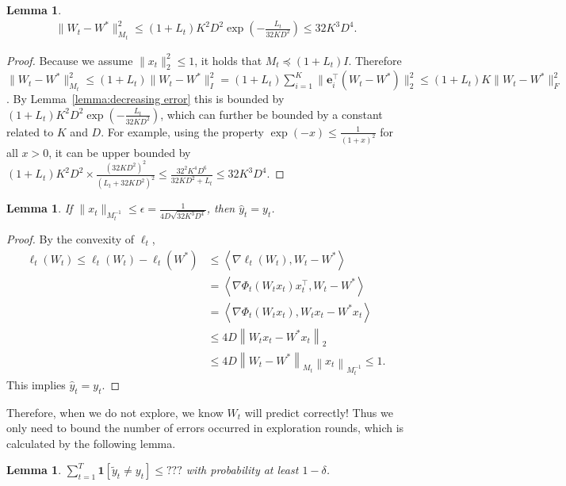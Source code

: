 \documentclass{article}
\newcommand{\one}{\boldsymbol{1}}
\newcommand{\nb}{\nabla}
\newcommand{\e}{\mathbf{e}}
\newcommand{\inner}[1]{ \left\langle {#1} \right\rangle }
\newcommand{\norm}[1]{\left\|{#1}\right\|}
\newtheorem{lemma}[theorem]{Lemma}
\begin{document}
\begin{lemma}
\begin{align*}
\|W_{t}-W^*\|_{M_{t}}^2 \leq (1+L_t)K^2D^2 \exp\left(-\frac{L_t}{32KD^2}\right) \leq 32K^3D^4. 
\end{align*}
\end{lemma}
\begin{proof}
Because we assume $\|x_t\|_2^2\leq 1$, it holds that $ M_t \preceq (1+L_t) I$. Therefore $\|W_t-W^*\|_{M_t}^2 \leq (1+L_t)\|W_t-W^*\|_I^2 =  (1+L_t) \sum_{i=1}^K \| \e_i^\top (W_t-W^*) \|_2^2 \leq (1+L_t) K \|W_t-W^*\|_F^2 $. By Lemma~\ref{lemma:decreasing error} this is bounded by $(1+L_t)K^2D^2\exp\left( -\frac{L_t}{32KD^2} \right)$, which can further be bounded by a constant related to $K$ and $D$. For example, using the property $\exp(-x)\leq \frac{1}{(1+x)^2}$ for all $x>0$, it can be upper bounded by $(1+L_t)K^2D^2 \times \frac{(32KD^2)^2}{(L_t+32KD^2)^2} \leq \frac{32^2K^4D^6}{32KD^2+L_t}\leq 32K^3D^4$.   
\end{proof}

\begin{lemma}
\label{lemma: xbounded}
If $\|x_t\|_{M_t^{-1}}\leq \epsilon = \frac{1}{4D\sqrt{32K^3D^4}}$, then $\hat{y}_t=y_t$. 
\end{lemma}
\begin{proof}
By the convexity of $\ell_t$, 
\begin{align*}
    \ell_t(W_t)\leq \ell_t(W_t)-\ell_t(W^*)&\leq \inner{\nb \ell_t(W_t), W_t-W^*}\\
     & = \inner{\nb\Phi_t(W_tx_t)x_t^\top, W_t - W^*} \\
    & = \inner{\nb\Phi_t(W_tx_t), W_tx_t - W^*x_t} \\
    & \leq 4D\norm{W_tx_t-W^*x_t}_2 \\
    & \leq 4D\norm{W_t-W^*}_{M_t}\norm{x_t}_{M_t^{-1}} \leq 1.
\end{align*}
This implies $\hat{y}_t=y_t$. 
\end{proof}

Therefore, when we do not explore, we know $W_t$ will predict correctly! Thus we only need to bound the number of errors occurred in exploration rounds, which is calculated by the following lemma. 
\begin{lemma}
\label{lemma:N}
$\sum_{t=1}^T \one[\tilde{y}_t\neq y_t] \leq ???$ with probability at least $1-\delta$. 
\end{lemma}
\end{document}
